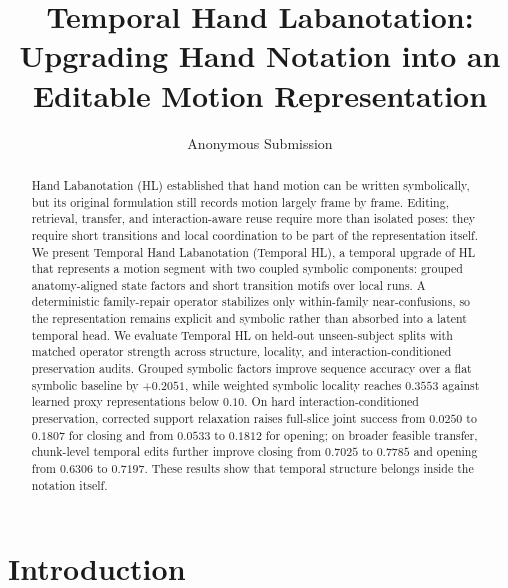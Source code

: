 \documentclass[letterpaper]{article}
\title{Temporal Hand Labanotation: Upgrading Hand Notation into an Editable Motion Representation}
\author{Anonymous Submission}
\newcommand{\method}{Temporal Hand Labanotation}
\newcommand{\thl}{Temporal HL}
\begin{document}
\maketitle

\begin{abstract}
Hand Labanotation (HL) established that hand motion can be written
symbolically, but its original formulation still records motion largely frame
by frame. Editing, retrieval, transfer, and interaction-aware reuse require
more than isolated poses: they require short transitions and local
coordination to be part of the representation itself. We
present \method{} (\thl{}), a temporal upgrade of HL that represents a motion
segment with two coupled symbolic components: grouped anatomy-aligned state
factors and short transition motifs over local runs. A deterministic
family-repair operator stabilizes only within-family near-confusions, so the
representation remains explicit and symbolic rather than absorbed into a latent
temporal head. We evaluate \thl{} on held-out unseen-subject splits with
matched operator strength across structure, locality, and
interaction-conditioned preservation audits. Grouped symbolic factors improve
sequence accuracy over a flat symbolic baseline by $+0.2051$, while weighted
symbolic locality reaches $0.3553$ against learned proxy representations below
$0.10$. On hard
interaction-conditioned preservation, corrected support relaxation raises
full-slice joint success from $0.0250$ to $0.1807$ for closing and from $0.0533$
to $0.1812$ for opening; on broader feasible transfer, chunk-level temporal
edits further improve closing from $0.7025$ to $0.7785$ and opening from
$0.6306$ to $0.7197$. These results show that temporal structure belongs inside
the notation itself.
\end{abstract}

\section{Introduction}
\end{document}
